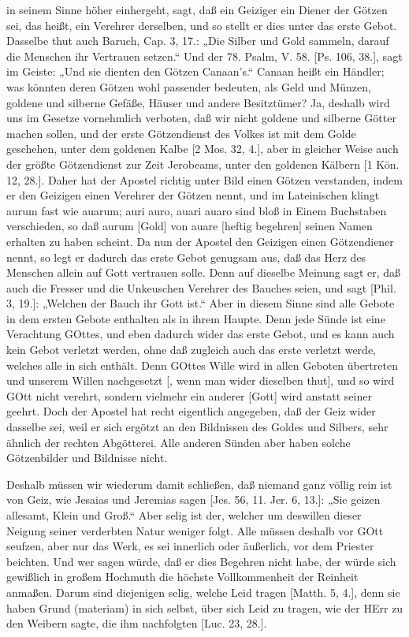in seinem Sinne höher einhergeht, sagt, daß ein Geiziger ein Diener der Götzen sei, das heißt, ein Verehrer derselben, und so stellt er dies unter das erste Gebot. Dasselbe thut auch Baruch, Cap. 3, 17.: „Die Silber und Gold sammeln, darauf die Menschen ihr Vertrauen setzen.“ Und der 78. Psalm, V. 58. [Ps. 106, 38.], sagt im Geiste: „Und sie dienten den Götzen Canaan's.“ Canaan heißt ein Händler; was könnten deren Götzen wohl passender bedeuten, als Geld und Münzen, goldene und silberne Gefäße, Häuser und andere Besitztümer? Ja, deshalb wird uns im Gesetze vornehmlich verboten, daß wir nicht goldene und silberne Götter machen sollen, und der erste Götzendienst des Volkes ist mit dem Golde geschehen, unter dem goldenen Kalbe [2 Mos. 32, 4.], aber in gleicher Weise auch der größte Götzendienst zur Zeit Jerobeams, unter den goldenen Kälbern [1 Kön. 12, 28.]. Daher hat der Apostel richtig unter Bild einen Götzen verstanden, indem er den Geizigen einen Verehrer der Götzen nennt, und im Lateinischen klingt aurum fast wie auarum; auri auro, auari auaro sind bloß in Einem Buchstaben verschieden, so daß aurum [Gold] von auare [heftig begehren] seinen Namen erhalten zu haben scheint. Da nun der Apostel den Geizigen einen Götzendiener nennt, so legt er dadurch das erste Gebot genugsam aus, daß das Herz des Menschen allein auf Gott vertrauen solle. Denn auf dieselbe Meinung sagt er, daß auch die Fresser und die Unkeuschen Verehrer des Bauches seien, und sagt [Phil. 3, 19.]: „Welchen der Bauch ihr Gott ist.“ Aber in diesem Sinne sind alle Gebote in dem ersten Gebote enthalten als in ihrem Haupte. Denn jede Sünde ist eine Verachtung GOttes, und eben dadurch wider das erste Gebot, und es kann auch kein Gebot verletzt werden, ohne daß zugleich auch das erste verletzt werde, welches alle in sich enthält. Denn GOttes Wille wird in allen Geboten übertreten und unserem Willen nachgesetzt [, wenn man wider dieselben thut], und so wird GOtt nicht verehrt, sondern vielmehr ein anderer [Gott] wird anstatt seiner geehrt. Doch der Apostel hat recht eigentlich angegeben, daß der Geiz wider dasselbe sei, weil er sich ergötzt an den Bildnissen des Goldes und Silbers, sehr ähnlich der rechten Abgötterei. Alle anderen Sünden aber haben solche Götzenbilder und Bildnisse nicht.

Deshalb müssen wir wiederum damit schließen, daß niemand ganz völlig rein ist von Geiz, wie Jesaias und Jeremias sagen [Jes. 56, 11. Jer. 6, 13.]: „Sie geizen allesamt, Klein und Groß.“ Aber selig ist der, welcher um deswillen dieser Neigung seiner verderbten Natur weniger folgt. Alle müssen deshalb vor GOtt seufzen, aber nur das Werk, es sei innerlich oder äußerlich, vor dem Priester beichten. Und wer sagen würde, daß er dies Begehren nicht habe, der würde sich gewißlich in großem Hochmuth die höchste Vollkommenheit der Reinheit anmaßen. Darum sind diejenigen selig, welche Leid tragen [Matth. 5, 4.], denn sie haben Grund (materiam) in sich selbst, über sich Leid zu tragen, wie der HErr zu den Weibern sagte, die ihm nachfolgten [Luc. 23, 28.].

